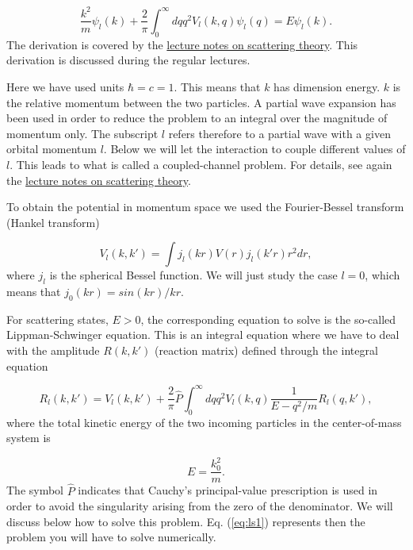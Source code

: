 \documentclass[%
oneside,                 %
final,                   %
10pt]{article}
\begin{document}
\begin{equation}
     \frac{k^2}{m}\psi_l(k)+\frac{2}{\pi}\int_0^{\infty}dqq^2V_l(k,q)\psi_l(q)=E\psi_l(k).
     \label{eq:sem}
\end{equation}
The derivation is covered by the \href{{https://manybodyphysics.github.io/NuclearForces/doc/pub/scatteringtheory/html/scatteringtheory-reveal.html}}{lecture notes on scattering theory}. This derivation is discussed during the regular lectures.

Here we have used units $\hbar=c=1$. This means that $k$ has dimension energy. 
$k$ is the relative momentum between the two particles. A partial
wave expansion has been used in order to reduce the problem to an integral
over the magnitude of momentum only. The subscript $l$ refers therefore to a partial wave with a given orbital momentum $l$. Below we will let the interaction to couple different values of $l$. This leads to what is called a coupled-channel problem. For details, see again the \href{{https://manybodyphysics.github.io/NuclearForces/doc/pub/scatteringtheory/html/scatteringtheory-reveal.html}}{lecture notes on scattering theory}.

To obtain the potential in momentum space we used 
the Fourier-Bessel transform (Hankel transform)

\begin{equation}
      V_l(k,k')= \int j_l(kr)V(r)j_l(k'r)r^2dr,
      \label{eq:vtrans}
\end{equation}
where $j_l$ is the spherical Bessel function. 
We will just study the case
$l=0$, which means that $j_0(kr)=sin(kr)/kr$. 

For scattering states, $E>0$, the corresponding equation to solve is 
the so-called Lippman-Schwinger equation. This is an integral equation
where we have to deal with the amplitude $R(k,k')$ (reaction matrix) 
defined through the integral equation

\begin{equation}
    R_l(k,k') = V_l(k,k') +\frac{2}{\pi}\hat{P}
                \int_0^{\infty}dqq^2V_l(k,q)\frac{1}{E-q^2/m}R_l(q,k'),
   \label{eq:ls1}
\end{equation}
where the total kinetic energy of the two 
incoming particles in the center-of-mass system
is

\begin{equation}
    E=\frac{k_0^2}{m}.
\end{equation}
The symbol $\hat{P}$ indicates that Cauchy's principal-value prescription
is used in order to avoid the singularity arising from the zero of the denominator.
We will discuss below how to solve this problem. Eq. (\ref{eq:ls1}) represents
then the problem you will have to solve numerically.
\end{document}
